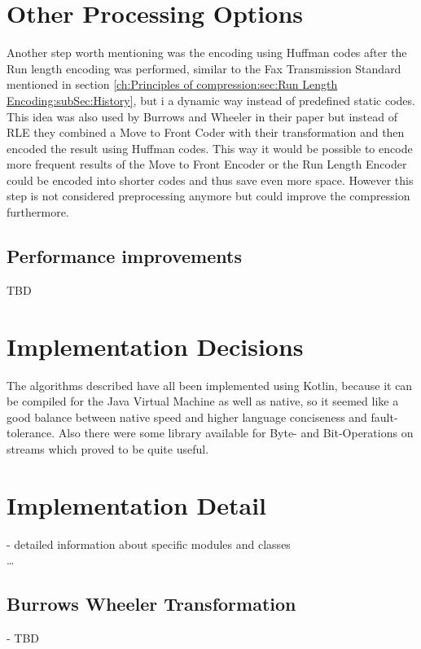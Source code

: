 {\section{Other Processing Options}
\label{ch:Conceptual Design:sec:Postprocessing}
Another step worth mentioning was the encoding using Huffman codes after the Run length encoding was performed, similar to the Fax Transmission Standard mentioned in section \ref{ch:Principles of compression:sec:Run Length Encoding:subSec:History}, but i a dynamic way instead of predefined static codes. This idea was also used by Burrows and Wheeler in their paper \cite{Burrows94} but instead of RLE they combined a Move to Front Coder with their transformation and then encoded the result using Huffman codes. This way it would be possible to encode more frequent results of the Move to Front Encoder or the Run Length Encoder could be encoded into shorter codes and thus save even more space. However this step is not considered preprocessing anymore but could improve the compression furthermore.

\subsection{Performance improvements}
TBD
\section{Implementation Decisions}
\label{ch:Conceptual Design:sec:Implementation Decisions}

The algorithms described have all been implemented using Kotlin, because it can be compiled for the Java Virtual Machine as well as native, so it seemed like a good balance between native speed and higher language conciseness and fault-tolerance. Also there were some library available for Byte- and Bit-Operations on streams which proved to be quite useful.

\section{Implementation Detail}
\label{ch:Conceptual Design:sec:Implementation Detail}
- detailed information about specific modules and classes\\
\ldots

\subsection{Burrows Wheeler Transformation}
- TBD\\
}
